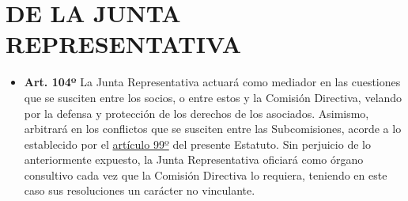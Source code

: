 \documentclass[]{book}
\providecommand{\tightlist}{%
  \setlength{\itemsep}{0pt}\setlength{\parskip}{0pt}}
\begin{document}
\chapter{DE LA JUNTA REPRESENTATIVA}\label{de-la-junta-representativa}

\begin{itemize}
\tightlist
\item
  \textbf{Art. 104º} La Junta Representativa actuará como mediador en
  las cuestiones que se susciten entre los socios, o entre estos y la
  Comisión Directiva, velando por la defensa y protección de los
  derechos de los asociados. Asimismo, arbitrará en los conflictos que
  se susciten entre las Subcomisiones, acorde a lo establecido por el
  \protect\hyperlink{art99}{artículo 99º} del presente Estatuto. Sin
  perjuicio de lo anteriormente expuesto, la Junta Representativa
  oficiará como órgano consultivo cada vez que la Comisión Directiva lo
  requiera, teniendo en este caso sus resoluciones un carácter no
  vinculante.
\end{itemize}
\end{document}
